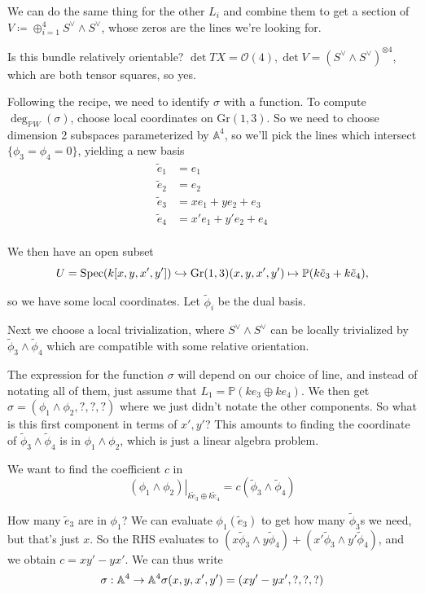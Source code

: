 \documentclass[11pt]{scrreprt}
\theoremstyle{definition}
\newcommand{\PP}[0]{{\mathbb{P}}}
\newcommand{\Af}[0]{{\mathbb{A}}}
\newcommand{\Gr}[0]{{\text{Gr}}}
\newcommand{\OO}[0]{{\mathcal{O}}}
\newcommand{\dual}[0]{\vee}
\newcommand{\spec}[0]{{\mathrm{Spec}}}
\newcommand{\theset}[1]{\{{#1}\}}
\newcommand{\restrictionof}[2]{{\left.{#1}\right|_{#2}}}
\newcommand{\tensor}[0]{\otimes}
\newcommand{\definedas}[0]{\coloneqq}
\newcommand{\injects}[0]{\hookrightarrow}
\begin{document}
We can do the same thing for the other \(L_i\) and combine them to get a
section of \(V \definedas \oplus_{i=1}^4S^\dual \wedge S^\dual\), whose
zeros are the lines we're looking for.

Is this bundle relatively orientable?
\(\det TX =\OO(4), \det V = (S^\dual \wedge S^\dual)^{\tensor 4}\),
which are both tensor squares, so yes.

Following the recipe, we need to identify \(\sigma\) with a function. To
compute \(\deg_{\PP W}(\sigma)\), choose local coordinates on
\(\Gr(1,3)\). So we need to choose dimension 2 subspaces parameterized
by \(\Af^4\), so we'll pick the lines which intersect
\(\theset{\phi_3= \phi_4 = 0}\), yielding a new basis \begin{align*}
\tilde e_1 &= e_1 \\
\tilde e_2 &= e_2 \\
\tilde e_3 &= xe_1 + ye_2 + e_3 \\
\tilde e_4 &= x'e_1 + y'e_2 + e_4 \\
\end{align*}

We then have an open subset \[
U =\spec(k[x,y,x',y']) \injects \Gr(1,3) \\
(x,y,x',y') \mapsto \PP(k\tilde e_3 +k\tilde e_4),
\]

so we have some local coordinates. Let \(\tilde \phi_i\) be the dual
basis.

Next we choose a local trivialization, where \(S^\dual \wedge S^\dual\)
can be locally trivialized by \(\tilde\phi_3 \wedge \tilde \phi_4\)
which are compatible with some relative orientation.

The expression for the function \(\sigma\) will depend on our choice of
line, and instead of notating all of them, just assume that
\(L_1 = \PP(ke_3 \oplus ke_4)\). We then get
\(\sigma =(\phi_1 \wedge \phi_2, ?, ?, ?)\) where we just didn't notate
the other components. So what is this first component in terms of
\(x', y'\)? This amounts to finding the coordinate of
\(\tilde\phi_3 \wedge \tilde\phi_4\) is in \(\phi_1 \wedge \phi_2\),
which is just a linear algebra problem.

We want to find the coefficient \(c\) in \[
\restrictionof{(\phi_1 \wedge \phi_2)}{k\tilde e_3 \oplus k\tilde e_4} = c (\tilde\phi_3 \wedge \tilde\phi_4)
\]

How many \(\tilde e_3\) are in \(\phi_1\)? We can evaluate
\(\phi_1(\tilde e_3)\) to get how many \(\tilde \phi_3\)s we need, but
that's just \(x\). So the RHS evaluates to
\((x \tilde\phi_3 \wedge y\tilde\phi_4) + (x'\tilde\phi_3 \wedge y'\tilde\phi_4)\),
and we obtain \(c = xy' -yx'\). We can thus write \[
\sigma: \Af^4 \to \Af^4 \\
\sigma(x,y,x',y') = (xy' -yx', ?, ? , ?)
\]
\end{document}
